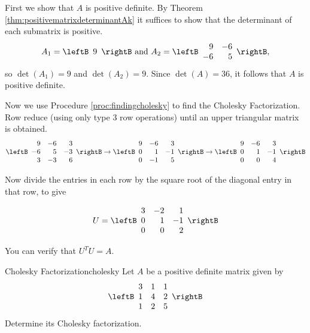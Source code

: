 \begin{solution}
First we show that $A$ is positive definite. By Theorem \ref{thm:positivematrixdeterminantAk} it suffices to show that the determinant of each submatrix is positive. 
\[ A_{1}=\leftB\begin{array}{c} 9 \end{array}\rightB
\mbox{ and }
A_{2}=\leftB\begin{array}{rr} 9 & -6 \\ -6 & 5 \end{array}\rightB,\]
so $\det(A_{1})=9$ and $\det(A_{2})=9$.
Since $\det(A)=36$, it follows that $A$ is positive definite.

Now we use Procedure \ref{proc:findingcholesky} to find the Cholesky Factorization. Row reduce (using only type $3$ row operations) until an upper triangular matrix is obtained. 
\[ \leftB\begin{array}{rrr}
9 & -6 & 3 \\ -6 & 5 & -3 \\ 3 & -3 & 6
\end{array}\rightB
\rightarrow
\leftB\begin{array}{rrr}
9 & -6 & 3 \\ 0 & 1 & -1 \\ 0 & -1 & 5
\end{array}\rightB
\rightarrow
\leftB\begin{array}{rrr}
9 & -6 & 3 \\ 0 & 1 & -1 \\ 0 & 0 & 4
\end{array}\rightB
\]

Now divide the entries in each row by the square root of the diagonal
entry in that row, to give

\[ U=\leftB\begin{array}{rrr}
3 & -2 & 1 \\ 0 & 1 & -1 \\ 0 & 0 & 2
\end{array}\rightB
\]

You can verify that $U^TU = A$.
\end{solution}

\begin{example}{Cholesky Factorization}{cholesky}
Let $A$ be a positive definite matrix given by 
\begin{equation*}
\leftB
\begin{array}{ccc}
3 & 1 & 1 \\ 
1 & 4 & 2 \\ 
1 & 2 & 5
\end{array}
\rightB
\end{equation*}
Determine its Cholesky factorization.
\end{example}

